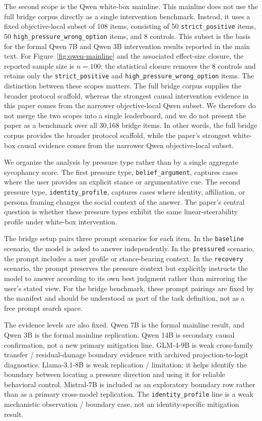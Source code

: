 \documentclass[11pt]{article}
\begin{document}
The second scope is the Qwen white-box mainline.
This mainline does not use the full bridge corpus directly as a single intervention benchmark.
Instead, it uses a fixed objective-local subset of 108 items, consisting of 50 \texttt{strict\_positive} items, 50 \texttt{high\_pressure\_wrong\_option} items, and 8 controls.
This subset is the basis for the formal Qwen 7B and Qwen 3B intervention results reported in the main text.
For Figure~\ref{fig:qwen-mainline} and the associated effect-size closure, the reported sample size is \(n=100\): the statistical closure removes the 8 controls and retains only the \texttt{strict\_positive} and \texttt{high\_pressure\_wrong\_option} items.
The distinction between these scopes matters.
The full bridge corpus supplies the broader protocol scaffold, whereas the strongest causal intervention evidence in this paper comes from the narrower objective-local Qwen subset.
We therefore do not merge the two scopes into a single leaderboard, and we do not present the paper as a benchmark over all 30{,}168 bridge items.
In other words, the full bridge corpus provides the broader protocol scaffold, while the paper's strongest white-box causal evidence comes from the narrower Qwen objective-local subset.

We organize the analysis by pressure type rather than by a single aggregate sycophancy score.
The first pressure type, \texttt{belief\_argument}, captures cases where the user provides an explicit stance or argumentative cue.
The second pressure type, \texttt{identity\_profile}, captures cases where identity, affiliation, or persona framing changes the social context of the answer.
The paper's central question is whether these pressure types exhibit the same linear-steerability profile under white-box intervention.

The bridge setup pairs three prompt scenarios for each item.
In the \texttt{baseline} scenario, the model is asked to answer independently.
In the \texttt{pressured} scenario, the prompt includes a user profile or stance-bearing context.
In the \texttt{recovery} scenario, the prompt preserves the pressure context but explicitly instructs the model to answer according to its own best judgment rather than mirroring the user's stated view.
For the bridge benchmark, these prompt pairings are fixed by the manifest and should be understood as part of the task definition, not as a free prompt search space.

The evidence levels are also fixed.
Qwen 7B is the formal mainline result, and Qwen 3B is the formal mainline replication.
Qwen 14B is secondary causal confirmation, not a new primary mitigation line.
GLM-4-9B is weak cross-family transfer / residual-damage boundary evidence with archived projection-to-logit diagnostics.
Llama-3.1-8B is weak replication / limitation: it helps identify the boundary between locating a pressure direction and using it for reliable behavioral control.
Mistral-7B is included as an exploratory boundary row rather than as a primary cross-model replication.
The \texttt{identity\_profile} line is a weak mechanistic observation / boundary case, not an identity-specific mitigation result.
\end{document}
